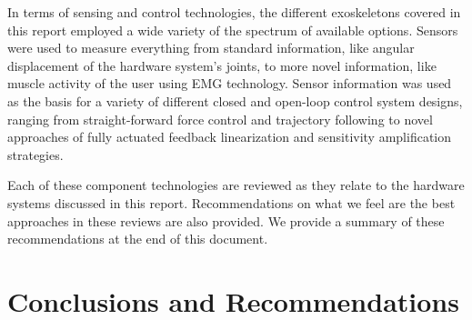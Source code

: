 \documentclass[letterpaper,12pt,fullpage]{article}
\begin{document}
In terms of sensing and control technologies, the different exoskeletons covered in this report employed a wide variety of the spectrum of available options.  Sensors were used to measure everything from standard information, like angular displacement of the hardware system's joints, to more novel information, like muscle activity of the user using EMG technology.  Sensor information was used as the basis for a variety of different closed and open-loop control system designs, ranging from straight-forward force control and trajectory following to novel approaches of fully actuated feedback linearization and sensitivity amplification strategies.  

Each of these component technologies are reviewed as they relate to the hardware systems discussed in this report.  Recommendations on what we feel are the best approaches in these reviews are also provided.  We provide a summary of these recommendations at the end of this document.

%

















\section{Conclusions and Recommendations}
\label{survey:recommend}
\end{document}
